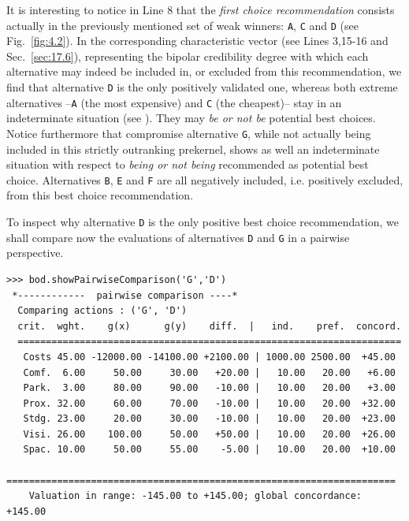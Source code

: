 It is interesting to notice in Line 8 that the \Rubis \emph{first choice recommendation} consists actually in the previously mentioned set of weak \Condorcet winners: \texttt{A}, \texttt{C} and \texttt{D} (see Fig.~\vref{fig:4.2}). In the corresponding characteristic vector (see Lines 3,15-16 and Sec.~\ref{sec:17.6}), representing the bipolar credibility degree with which each alternative may indeed be included in, or excluded from this recommendation, we find that alternative \texttt{D} is the only positively validated one, whereas both extreme alternatives --\texttt{A} (the most expensive) and \texttt{C} (the cheapest)-- stay in an indeterminate situation (see \citealp{BIS-2006a,BIS-2006b}). They may \emph{be or not be} potential best choices. Notice furthermore that compromise alternative \texttt{G}, while not actually being included in this strictly outranking prekernel, shows as well an indeterminate situation with respect to \emph{being or not being} recommended as potential best choice. Alternatives \texttt{B}, \texttt{E} and \texttt{F} are all negatively included, i.e. positively excluded, from this best choice recommendation.

To inspect why alternative \texttt{D} is the only positive best choice recommendation, we shall compare now the evaluations of alternatives \texttt{D} and \texttt{G} in a pairwise perspective.
\begin{lstlisting}[caption={Inspecting pairwise comparison between alternatives \texttt{G} and \texttt{D}},label=list:4.5,basicstyle=\ttfamily\scriptsize]
>>> bod.showPairwiseComparison('G','D')
 *------------  pairwise comparison ----*
  Comparing actions : ('G', 'D')
  crit.  wght.    g(x)      g(y)    diff.  |   ind.    pref.  concord. 
  ====================================================================
   Costs 45.00 -12000.00 -14100.00 +2100.00 | 1000.00 2500.00  +45.00  
   Comf.  6.00     50.00     30.00   +20.00 |   10.00   20.00   +6.00 
   Park.  3.00     80.00     90.00   -10.00 |   10.00   20.00   +3.00 
   Prox. 32.00     60.00     70.00   -10.00 |   10.00   20.00  +32.00 
   Stdg. 23.00     20.00     30.00   -10.00 |   10.00   20.00  +23.00 
   Visi. 26.00    100.00     50.00   +50.00 |   10.00   20.00  +26.00 
   Spac. 10.00     50.00     55.00    -5.00 |   10.00   20.00  +10.00
   =====================================================================
    Valuation in range: -145.00 to +145.00; global concordance: +145.00
\end{lstlisting}

